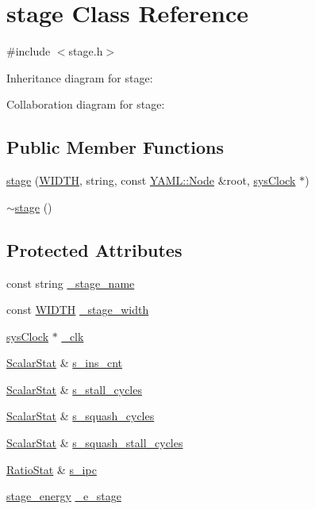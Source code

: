 \hypertarget{classstage}{
\section{stage Class Reference}
\label{classstage}
}


{\ttfamily \#include $<$stage.h$>$}



Inheritance diagram for stage:


Collaboration diagram for stage:
\subsection*{Public Member Functions}
\begin{DoxyCompactItemize}
\item 
\hyperlink{classstage_af7798f81a3204e4415a4c8e546f2e25b}{stage} (\hyperlink{global_2global_8h_a6fa2e24b8a418fa215e183264cbea3aa}{WIDTH}, string, const \hyperlink{classYAML_1_1Node}{YAML::Node} \&root, \hyperlink{classsysClock}{sysClock} $\ast$)
\item 
\hyperlink{classstage_a680eded15b373eaba43a71a68c97bb73}{$\sim$stage} ()
\end{DoxyCompactItemize}
\subsection*{Protected Attributes}
\begin{DoxyCompactItemize}
\item 
const string \hyperlink{classstage_ad8500743b9a08a7d3b7a16e2c9ee7bca}{\_\-stage\_\-name}
\item 
const \hyperlink{global_2global_8h_a6fa2e24b8a418fa215e183264cbea3aa}{WIDTH} \hyperlink{classstage_a758da5ef14d0eca96290d4feaad91302}{\_\-stage\_\-width}
\item 
\hyperlink{classsysClock}{sysClock} $\ast$ \hyperlink{classstage_a2a24f2b2bce75ee75d7d03962eb0cd23}{\_\-clk}
\item 
\hyperlink{classScalarStat}{ScalarStat} \& \hyperlink{classstage_a41c52c3b31e0cd1729c3665bbacb4f5d}{s\_\-ins\_\-cnt}
\item 
\hyperlink{classScalarStat}{ScalarStat} \& \hyperlink{classstage_a257d798bacbed096d4e9879d4d47c207}{s\_\-stall\_\-cycles}
\item 
\hyperlink{classScalarStat}{ScalarStat} \& \hyperlink{classstage_a8936cf4c32fa9d9f27ca8d3306468cc8}{s\_\-squash\_\-cycles}
\item 
\hyperlink{classScalarStat}{ScalarStat} \& \hyperlink{classstage_ac8c48351ea5ff2ad92e097f1ab3684e0}{s\_\-squash\_\-stall\_\-cycles}
\item 
\hyperlink{classRatioStat}{RatioStat} \& \hyperlink{classstage_a31614935ce5336305af2d3dfc6fd85b6}{s\_\-ipc}
\item 
\hyperlink{classstage__energy}{stage\_\-energy} \hyperlink{classstage_abb5082df431c2858839d3b54ef049ff9}{\_\-e\_\-stage}
\end{DoxyCompactItemize}


